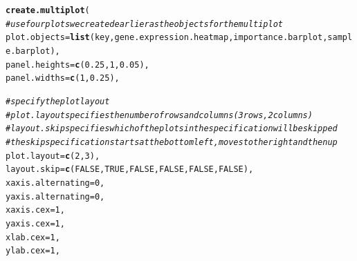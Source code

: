 \documentclass[letterpaper]{article}\usepackage[]{graphicx}\usepackage[]{color}
\makeatletter
\newcommand{\hlnum}[1]{\textcolor[rgb]{0.686,0.059,0.569}{#1}}%
\newcommand{\hlcom}[1]{\textcolor[rgb]{0.678,0.584,0.686}{\textit{#1}}}%
\newcommand{\hlstd}[1]{\textcolor[rgb]{0.345,0.345,0.345}{#1}}%
\newcommand{\hlkwc}[1]{\textcolor[rgb]{0.333,0.667,0.333}{#1}}%
\newcommand{\hlkwd}[1]{\textcolor[rgb]{0.737,0.353,0.396}{\textbf{#1}}}%
\newenvironment{kframe}{%
 \def\at@end@of@kframe{}%
 \ifinner\ifhmode%
  \def\at@end@of@kframe{\end{minipage}}%
  \begin{minipage}{\columnwidth}%
 \fi\fi%
 \def\FrameCommand##1{\hskip\@totalleftmargin \hskip-\fboxsep
 \colorbox{shadecolor}{##1}\hskip-\fboxsep
     \hskip-\linewidth \hskip-\@totalleftmargin \hskip\columnwidth}%
 \MakeFramed {\advance\hsize-\width
   \@totalleftmargin\z@ \linewidth\hsize
   \@setminipage}}%
 {\par\unskip\endMakeFramed%
 \at@end@of@kframe}
\newenvironment{knitrout}{}{} %
\makeatother
\begin{document}
\begin{knitrout}
\color{fgcolor}\begin{kframe}
\begin{alltt}
\hlkwd{create.multiplot}\hlstd{(}
    \hlcom{# use four plots we created earlier as the objects for the multiplot}
    \hlkwc{plot.objects} \hlstd{=} \hlkwd{list}\hlstd{(key, gene.expression.heatmap, importance.barplot, sample.barplot),}
    \hlkwc{panel.heights} \hlstd{=} \hlkwd{c}\hlstd{(}\hlnum{0.25}\hlstd{,} \hlnum{1}\hlstd{,} \hlnum{0.05}\hlstd{),}
    \hlkwc{panel.widths} \hlstd{=} \hlkwd{c}\hlstd{(}\hlnum{1}\hlstd{,} \hlnum{0.25}\hlstd{),}

    \hlcom{# specify the plot layout }
    \hlcom{# plot.layout specifies the number of rows and columns (3 rows, 2 columns)}
    \hlcom{# layout.skip specifies which of the plots in the specification will be skipped}
    \hlcom{# the skip specification starts at the bottom left, moves to the right and then up}
    \hlkwc{plot.layout} \hlstd{=} \hlkwd{c}\hlstd{(}\hlnum{2}\hlstd{,} \hlnum{3}\hlstd{),}
    \hlkwc{layout.skip} \hlstd{=} \hlkwd{c}\hlstd{(}\hlnum{FALSE}\hlstd{,} \hlnum{TRUE}\hlstd{,} \hlnum{FALSE}\hlstd{,} \hlnum{FALSE}\hlstd{,} \hlnum{FALSE}\hlstd{,} \hlnum{FALSE}\hlstd{),}
    \hlkwc{xaxis.alternating} \hlstd{=} \hlnum{0}\hlstd{,}
    \hlkwc{yaxis.alternating} \hlstd{=} \hlnum{0}\hlstd{,}
    \hlkwc{xaxis.cex} \hlstd{=} \hlnum{1}\hlstd{,}
    \hlkwc{yaxis.cex} \hlstd{=} \hlnum{1}\hlstd{,}
    \hlkwc{xlab.cex} \hlstd{=} \hlnum{1}\hlstd{,}
    \hlkwc{ylab.cex} \hlstd{=} \hlnum{1}\hlstd{,}


\end{alltt}
\end{kframe}
\end{knitrout}
\end{document}
